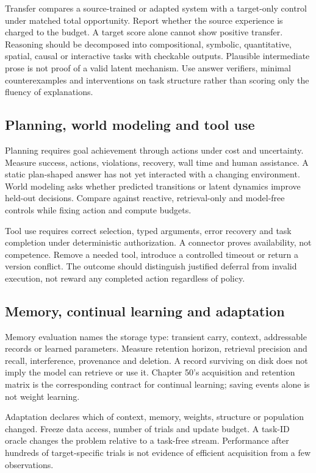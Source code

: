 Transfer compares a source-trained or adapted system with a target-only control
under matched total opportunity. Report whether the source experience is charged
to the budget. A target score alone cannot show positive transfer. Reasoning
should be decomposed into compositional, symbolic, quantitative, spatial,
causal or interactive tasks with checkable outputs. Plausible intermediate
prose is not proof of a valid latent mechanism. Use answer verifiers, minimal
counterexamples and interventions on task structure rather than scoring only
the fluency of explanations.

\subsection{Planning, world modeling and tool use}
Planning requires goal achievement through actions under cost and uncertainty.
Measure success, actions, violations, recovery, wall time and human assistance.
A static plan-shaped answer has not yet interacted with a changing environment.
World modeling asks whether predicted transitions or latent dynamics improve
held-out decisions. Compare against reactive, retrieval-only and model-free
controls while fixing action and compute budgets.

Tool use requires correct selection, typed arguments, error recovery and task
completion under deterministic authorization. A connector proves availability,
not competence. Remove a needed tool, introduce a controlled timeout or return
a version conflict. The outcome should distinguish justified deferral from
invalid execution, not reward any completed action regardless of policy.

\subsection{Memory, continual learning and adaptation}
Memory evaluation names the storage type: transient carry, context, addressable
records or learned parameters. Measure retention horizon, retrieval precision
and recall, interference, provenance and deletion. A record surviving on disk
does not imply the model can retrieve or use it. Chapter 50's acquisition and
retention matrix is the corresponding contract for continual learning; saving
events alone is not weight learning.

Adaptation declares which of context, memory, weights, structure or population
changed. Freeze data access, number of trials and update budget. A task-ID
oracle changes the problem relative to a task-free stream. Performance after
hundreds of target-specific trials is not evidence of efficient acquisition
from a few observations.

